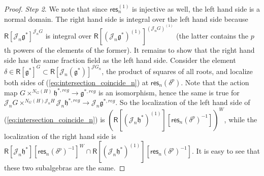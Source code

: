 \documentclass{amsart}
\theoremstyle{definition}
\newcommand{\Ring}{\mathsf{R}}
\newcommand{\g}{\mathfrak{g}}
\newcommand{\h}{\mathfrak{h}}
\newcommand{\im}{\operatorname{im}}
\newcommand{\Jet}{\mathscr{J}}
\numberwithin{equation}{section}
\begin{document}
\begin{proof}
{\it Step 2}.
We note that since $\mathsf{res}_n^{(1)}$ is injective as well, the left hand side is a normal domain. The right hand side is integral over the left hand side because 
$\Ring[\Jet_n\g^*]^{\Jet_n G}$ is integral over $\Ring[(\Jet_n\g^*)^{(1)}]^{(\Jet_n G)^{(1)}}$
(the latter contains the $p$th powers of the elements of the former).
It remains to show that the right hand side has the same fraction field as the left hand side. Consider the element 
$\delta\in \Ring[\g^*]^G\subset \Ring[\Jet_n (\g^*)]^{\Jet G_n}$, the product of squares of all roots, and localize both sides of (\ref{eq:intersection_coincide_n}) at
$\mathsf{res}_n(\delta^p)$. Note that the action map 
$G\times^{N_G(H)}\h^{*,reg}\rightarrow \g^{*,reg}$
is an isomorphism, hence the same is true for 
$\Jet_nG\times^{N_G(H)\Jet_nH}\Jet_n\h^{*,reg}\rightarrow \Jet_n\g^{*,reg}$. So the localization of the left hand side of (\ref{eq:intersection_coincide_n}) is 
$\left(\Ring[(\Jet_n\h^*)^{(1)}][\mathsf{res}_n(\delta^{p})^{-1}]\right)^W$, while the localization of the right hand side is $\Ring[\Jet_n \h^*][\mathsf{res}_n(\delta^{p})^{-1}]^W\cap 
\Ring[(\Jet_n \h^*)^{(1)}][\mathsf{res}_n(\delta^{p})^{-1}]$.
It is easy to see that these two subalgebras are the same. 
\end{proof}
\end{document}
